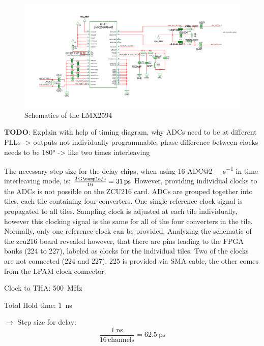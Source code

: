 
\begin{figure}[tbh]
	\centering
	\includegraphics[width = \textwidth]{chap/04-work/img/lmx2594}
	\caption{Schematics of the LMX2594}
	\label{fig:lmx2594}
\end{figure}

\textbf{TODO}: Explain with help of timing diagram, why ADCs need to be at different PLLs -> outputs not individually programmable. phase difference between clocks needs to be 180° -> like two times interleaving

The necessary step size for the delay chips, when using 16 ADC@\SI{2}{\giga \sample \per \second} in time-interleaving mode, is: $\frac{\SI{2}{\giga \sample \per \second}}{16} = \SI{31}{\pico \second}$
However, providing individual clocks to the ADCs is not possible on the ZCU216 card. ADCs are grouped together into tiles, each tile containing four converters. One single reference clock signal is propagated to all tiles. Sampling clock is adjusted at each tile individually, however this clocking signal is the same for all of the four converters in the tile. Normally, only one reference clock can be provided. Analyzing the schematic of the zcu216 board revealed however, that there are pins leading to the FPGA banks (224 to 227), labeled as clocks for the individual tiles. Two of the clocks are not connected (224 and 227). 225 is provided via SMA cable, the other comes from the LPAM clock connector.  

Clock to THA: \SI{500}{\mega \hertz}

Total Hold time: \SI{1}{\nano \second}

$\rightarrow$ Step size for delay:
\begin{equation}
	\frac{\SI{1}{\nano \second}}{16 \, \text{channels}} = \SI{62.5}{\pico \second}
\end{equation}

